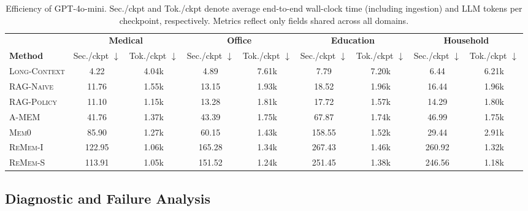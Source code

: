 \documentclass{llmxive}
\providecommand{\arraystretch}{1.22}
\begin{document}
\begin{table}[t]
\centering
\begingroup
\footnotesize
\setlength{\tabcolsep}{4.2pt}
\renewcommand{\arraystretch}{1.08}
\begin{tabular*}{\textwidth}{@{\extracolsep{\fill}}lcc|cc|cc|cc@{}}
\toprule
& \multicolumn{2}{c|}{\textbf{Medical}}
& \multicolumn{2}{c|}{\textbf{Office}}
& \multicolumn{2}{c|}{\textbf{Education}}
& \multicolumn{2}{c}{\textbf{Household}} \\
\cmidrule(lr){2-3}
\cmidrule(lr){4-5}
\cmidrule(lr){6-7}
\cmidrule(lr){8-9}
\textbf{Method}
& Sec./ckpt $\downarrow$ & Tok./ckpt $\downarrow$
& Sec./ckpt $\downarrow$ & Tok./ckpt $\downarrow$
& Sec./ckpt $\downarrow$ & Tok./ckpt $\downarrow$
& Sec./ckpt $\downarrow$ & Tok./ckpt $\downarrow$ \\
\midrule

\textsc{Long-Context}
& 4.22 & 4.04k
& 4.89 & 7.61k
& 7.79 & 7.20k
& 6.44 & 6.21k \\

\textsc{RAG-Naive}
& 11.76 & 1.55k
& 13.15 & 1.93k
& 18.52 & 1.96k
& 16.44 & 1.96k \\

\textsc{RAG-Policy}
& 11.10 & 1.15k
& 13.28 & 1.81k
& 17.72 & 1.57k
& 14.29 & 1.80k \\

\textsc{A-MEM}
& 41.76 & 1.37k
& 43.39 & 1.75k
& 67.87 & 1.74k
& 46.99 & 1.75k \\

\textsc{Mem0}
& 85.90 & 1.27k
& 60.15 & 1.43k
& 158.55 & 1.52k
& 29.44 & 2.91k \\

\textsc{ReMem-I}
& 122.95 & 1.06k
& 165.28 & 1.34k
& 267.43 & 1.46k
& 260.92 & 1.32k \\

\textsc{ReMem-S}
& 113.91 & 1.05k
& 151.52 & 1.24k
& 251.45 & 1.38k
& 246.56 & 1.18k \\

\bottomrule
\end{tabular*}
\endgroup
\caption{
Efficiency of GPT-4o-mini. Sec./ckpt and Tok./ckpt denote average end-to-end wall-clock time (including ingestion) and LLM tokens per checkpoint, respectively. Metrics reflect only fields shared across all domains.}
\label{tab:cost-results}
\end{table}

\subsection{Diagnostic and Failure Analysis}
\label{subsec:diagnostic-failure}
\end{document}
